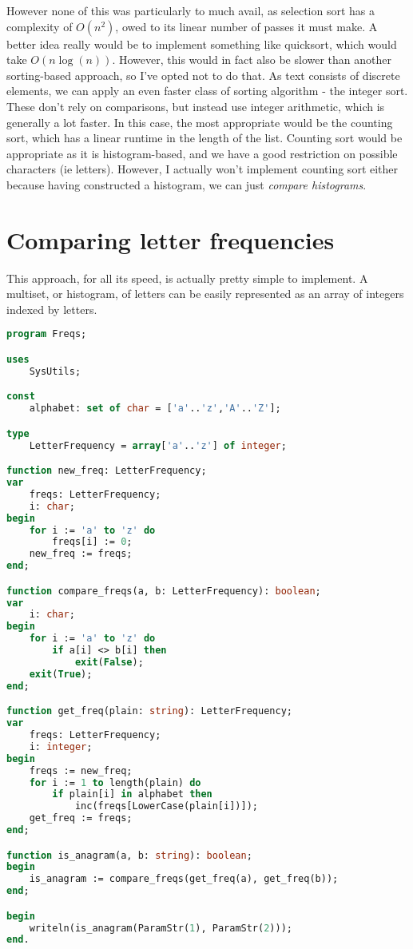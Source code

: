 \documentclass{article}
\begin{document}
    However none of this was particularly to much avail, as selection sort has
    a complexity of $O(n^2)$, owed to its linear number of passes it must make.
    A better idea really would be to implement something like quicksort, which
    would take $O(n \log(n))$. However, this would in fact also be slower than
    another sorting-based approach, so I've opted not to do that. As text
    consists of discrete elements, we can apply an even faster class of sorting
    algorithm - the integer sort. These don't rely on comparisons, but instead
    use integer arithmetic, which is generally a lot faster. In this case, the
    most appropriate would be the counting sort, which has a linear runtime in
    the length of the list. Counting sort would be appropriate as it is
    histogram-based, and we have a good restriction on possible characters (ie
    letters). However, I actually won't implement counting sort either because
    having constructed a histogram, we can just \textit{compare histograms}.

    \section{Comparing letter frequencies}

    This approach, for all its speed, is actually pretty simple to implement. A
    multiset, or histogram, of letters can be easily represented as an array of
    integers indexed by letters.

\begin{lstlisting}[language=Pascal, caption=Basic letter frequencies in Pascal]
program Freqs;

uses
    SysUtils;

const
    alphabet: set of char = ['a'..'z','A'..'Z'];

type
    LetterFrequency = array['a'..'z'] of integer;

function new_freq: LetterFrequency;
var
    freqs: LetterFrequency;
    i: char;
begin
    for i := 'a' to 'z' do
        freqs[i] := 0;
    new_freq := freqs;
end;

function compare_freqs(a, b: LetterFrequency): boolean;
var
    i: char;
begin
    for i := 'a' to 'z' do
        if a[i] <> b[i] then
            exit(False);
    exit(True);
end;

function get_freq(plain: string): LetterFrequency;
var
    freqs: LetterFrequency;
    i: integer;
begin
    freqs := new_freq;
    for i := 1 to length(plain) do
        if plain[i] in alphabet then
            inc(freqs[LowerCase(plain[i])]);
    get_freq := freqs;
end;

function is_anagram(a, b: string): boolean;
begin
    is_anagram := compare_freqs(get_freq(a), get_freq(b));
end;

begin
    writeln(is_anagram(ParamStr(1), ParamStr(2)));
end.
\end{lstlisting}
\end{document}
